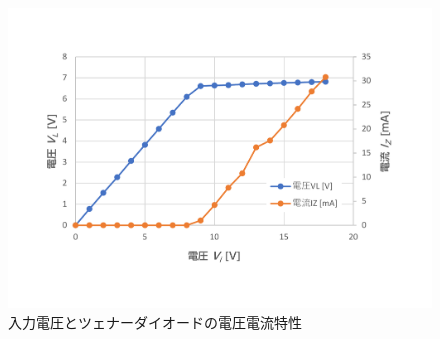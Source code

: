 	\begin{figure}[!h]
    \centering
    \includegraphics[width=13cm]{./figs/G-zener_Vi-VLIZ.pdf}
    \caption{入力電圧とツェナーダイオードの電圧電流特性}
    \label{fig:zener_Vi-VLIZ}
  \end{figure}

